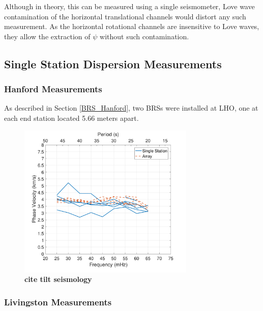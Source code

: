 \documentclass [12pt, proquest]{uwthesis}[2019]
\begin{document}
Although in theory, this can be measured using a single seismometer, Love wave contamination of the horizontal translational channels would distort any such measurement. As the horizontal rotational channels are insensitive to Love waves, they allow the extraction of $\psi$ without such contamination.  

\subsection{Single Station Dispersion Measurements}
\subsubsection{Hanford Measurements}
As described in Section \ref{BRS_Hanford}, two BRSs were installed at LHO, one at each end station located 5.66 meters apart. 
 
\begin{figure}%
\begin{center}
\includegraphics[width=0.75\textwidth]{Vel.pdf}
\caption{\textbf{cite tilt seismology}}
\label{Phase_Hanford}
\end{center}
\end{figure}

\subsubsection{Livingston Measurements}
\end{document}
